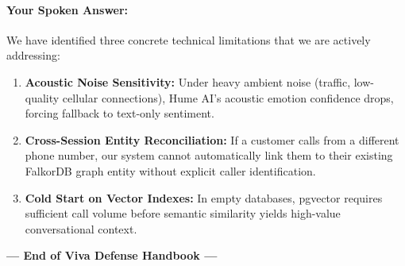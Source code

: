 \documentclass[11pt,a4paper]{article}
\begin{document}
\paragraph{Your Spoken Answer:}
We have identified three concrete technical limitations that we are actively addressing:
\begin{enumerate}
    \item \textbf{Acoustic Noise Sensitivity:} Under heavy ambient noise (traffic, low-quality cellular connections), Hume AI's acoustic emotion confidence drops, forcing fallback to text-only sentiment.
    \item \textbf{Cross-Session Entity Reconciliation:} If a customer calls from a different phone number, our system cannot automatically link them to their existing FalkorDB graph entity without explicit caller identification.
    \item \textbf{Cold Start on Vector Indexes:} In empty databases, pgvector requires sufficient call volume before semantic similarity yields high-value conversational context.
\end{enumerate}

\vspace{2em}
\begin{center}
    \textbf{--- End of Viva Defense Handbook ---}
\end{center}
\end{document}
